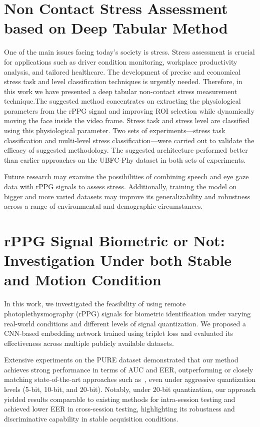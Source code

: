 \section{Non Contact Stress Assessment based on Deep Tabular
Method}
One of the main issues facing today's society is stress. Stress assessment is crucial for applications such as driver condition monitoring, workplace productivity analysis, and tailored healthcare. The development of precise and economical stress task and level classification techniques is urgently needed. Therefore, in this work we have presented a deep tabular  non-contact stress measurement technique.The suggested method concentrates on extracting the physiological parameters from the rPPG signal and improving ROI selection while dynamically moving the face inside the video frame. Stress task and stress level are classified using this physiological parameter.
Two sets of experiments—stress task classification and multi-level stress classification—were carried out to validate the efficacy of suggested methodology.
 The suggested architecture performed better than earlier approaches on the UBFC-Phy dataset in both sets of experiments.

Future research may examine the possibilities of combining speech and eye gaze data with rPPG signals to assess stress. Additionally, training the model on bigger and more varied datasets may improve its generalizability and robustness across a range of environmental and demographic circumstances.

\section{rPPG Signal Biometric or Not: Investigation Under
both Stable and Motion Condition}

In this work, we investigated the feasibility of using remote photoplethysmography (rPPG) signals for biometric identification under varying real-world conditions and different levels of signal quantization. We proposed a CNN-based embedding network trained using triplet loss and evaluated its effectiveness across multiple publicly available datasets.

Extensive experiments on the PURE dataset demonstrated that our method achieves strong performance in terms of AUC and EER, outperforming or closely matching state-of-the-art approaches such as~\cite{sun2024biometric}, even under aggressive quantization levels (5-bit, 10-bit, and 20-bit). Notably, under 20-bit quantization, our approach yielded results comparable to existing methods for intra-session testing and achieved lower EER in cross-session testing, highlighting its robustness and discriminative capability in stable acquisition conditions.

